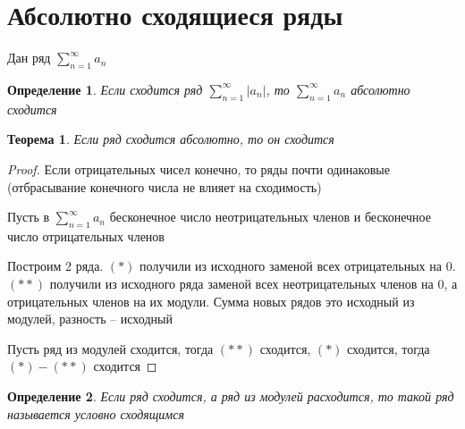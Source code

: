 \documentclass{scrartcl}
\newtheorem{theorem}{Теорема}
\newtheorem{definition}{Определение}
\begin{document}
\section{Абсолютно сходящиеся ряды}
Дан ряд $\sum_{n=1}^{\infty} a_{n}$ 
\begin{definition}
    Если сходится ряд $\sum_{n=1}^{\infty} |a_{n}|$, то $\sum_{n=1}^{\infty} a_{n}$ 
    абсолютно сходится
\end{definition}
\begin{theorem}
    Если ряд сходится абсолютно, то он сходится 
\end{theorem}
\begin{proof}
    Если отрицательных чисел конечно, то ряды почти одинаковые (отбрасывание конечного числа не влияет на сходимость)

    Пусть в $\sum_{n=1}^{\infty} a_{n}$ бесконечное число неотрицательных членов и бесконечное число отрицательных членов

    Построим 2 ряда. $(*)$ получили из исходного заменой всех отрицательных на 0. $(**)$ получили из исходного ряда заменой всех неотрицательных членов на 0, а отрицательных членов на их модули. Сумма новых рядов это исходный из модулей, разность -- исходный
    
    Пусть ряд из модулей сходится, тогда  $(**)$ сходится,  $(*)$ сходится, тогда  $(*) - (**)$ сходится
\end{proof}
\begin{definition}
    Если ряд сходится, а ряд из модулей расходится, то такой ряд называется условно сходящимся
\end{definition}
\end{document}
